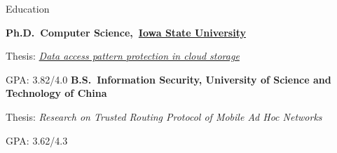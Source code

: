 \begin{rubric}{Education}

\entry*[2010 -- 2016]%
    \textbf{Ph.D.~Computer Science,~\href{https://www.iastate.edu}{Iowa State University}}
    \par Thesis: \emph{\href{http://lib.dr.iastate.edu/etd/15182/}{Data access pattern protection in cloud storage}}
    \par GPA: 3.82/4.0
%
\entry*[2006 -- 2010]%
	\textbf{B.S.~Information Security, University of Science and Technology of China}
	\par Thesis: \emph{Research on Trusted Routing Protocol of Mobile Ad Hoc Networks}
	\par GPA: 3.62/4.3
%
\end{rubric}